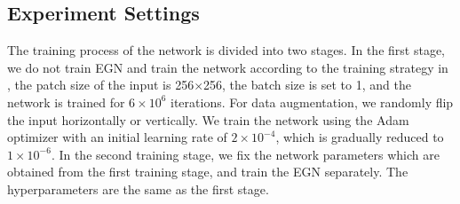 \begin{sloppypar}
\subsection{Experiment Settings}
The training process of the network is divided into two stages. In the first stage, we do not train EGN and train the network according to the training strategy in \cite{7}, the patch size of the input is 256$\times$256, the batch size is set to 1, and the network is trained for $6\times10^{6}$ iterations. For data augmentation, we randomly flip the input horizontally or vertically. We train the network using the Adam optimizer with an initial learning rate of $2\times10^{-4}$, which is gradually reduced to $1\times10^{-6}$. In the second training stage, we fix the network parameters which are obtained from the first training stage, and train the EGN separately. The hyperparameters are the same as the first stage. 

\end{sloppypar}
